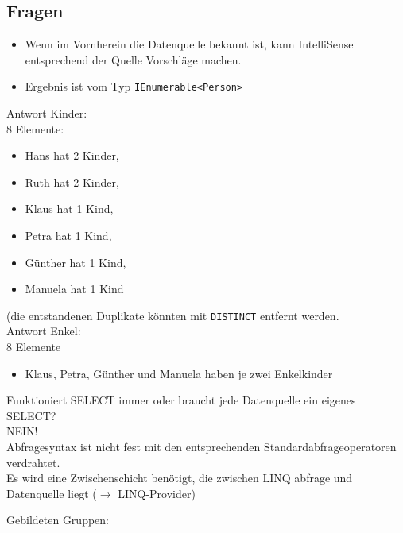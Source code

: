 \subsection{Fragen}
\begin{itemize}
\item Wenn im Vornherein die Datenquelle bekannt ist, kann IntelliSense entsprechend der Quelle Vorschläge machen.
\item Ergebnis ist vom Typ \lstinline`IEnumerable<Person>`
\end{itemize}



Antwort Kinder:\\
8 Elemente:
\begin{itemize}
\item Hans hat 2 Kinder, 
\item Ruth hat 2 Kinder,
\item Klaus hat 1 Kind,
\item Petra hat 1 Kind,
\item Günther hat 1 Kind,
\item Manuela hat 1 Kind
\end{itemize}
(die entstandenen Duplikate könnten mit \lstinline`DISTINCT` entfernt werden.\bigskip\\
Antwort Enkel:\\
8 Elemente
\begin{itemize}
\item Klaus, Petra, Günther und Manuela haben je zwei Enkelkinder 
\end{itemize}


Funktioniert SELECT immer oder braucht jede Datenquelle ein eigenes SELECT?\\

NEIN!\\
Abfragesyntax ist nicht fest mit den entsprechenden Standardabfrageoperatoren verdrahtet.\\
Es wird eine Zwischenschicht benötigt, die zwischen LINQ abfrage und Datenquelle liegt ($\to$ LINQ-Provider)

Gebildeten Gruppen:

